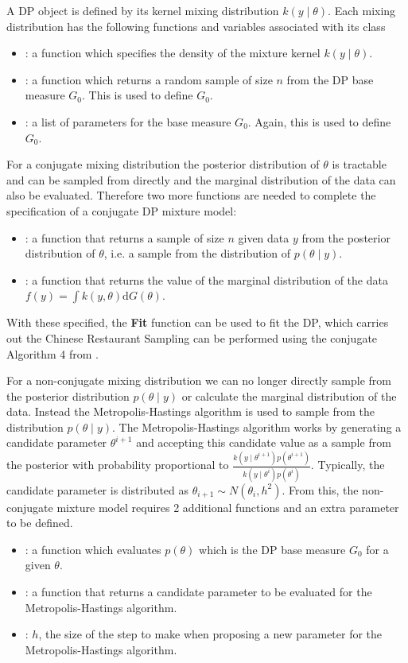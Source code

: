 \documentclass[nojss]{jss}
\begin{document}
A DP object is defined by its kernel mixing distribution $k(y \mid \theta)$. Each mixing distribution has the following functions and variables associated with its class
\begin{itemize}
\item {}: a function which specifies the density of the mixture kernel $k(y \mid \theta)$.
\item {}: a function which returns a random sample of size $n$ from the DP base measure $G_0$. This is used to define $G_0$.
\item {}: a list of parameters for the base measure $G_0$. Again, this is used to define $G_0$.
\end{itemize}

For a conjugate mixing distribution the posterior distribution of $\theta$ is tractable and can be sampled from directly and the marginal distribution of the data can also be evaluated. Therefore two more functions are needed to complete the specification of a conjugate DP mixture model:
\begin{itemize}
\item {}: a function that returns a sample of size $n$ given data $y$ from the posterior distribution of $\theta$, i.e. a sample from the distribution of $p(\theta \mid y)$.
\item {}: a function that returns the value of the marginal distribution of the data $f(y) = \int k(y , \theta) \mathrm{d} G(\theta)$.
\end{itemize}

With these specified, the \textbf{Fit} function can be used to fit the DP, which carries out the Chinese Restaurant Sampling can be performed using the conjugate Algorithm 4 from \citep{neal_markov_2000}.

For a non-conjugate mixing distribution we can no longer directly sample from the posterior distribution $p(\theta \mid y)$ or calculate the marginal distribution of the data. Instead the Metropolis-Hastings algorithm is used to sample from the distribution $p(\theta \mid y)$. The Metropolis-Hastings algorithm works by generating a candidate parameter $\theta ^{i+1}$ and accepting this candidate value as a sample from the posterior with probability proportional to $\frac{k(y \mid \theta ^{i+1}) p(\theta ^{i+1})}{k(y \mid \theta^i) p(\theta^i)}$. Typically, the candidate parameter is distributed as $\theta _{i+1} \sim N(\theta _i, h^2)$. From this, the non-conjugate mixture model requires 2 additional functions and an extra parameter to be defined.
\begin{itemize}
\item {}: a function which evaluates $p(\theta)$ which is the DP base measure $G_0$ for a given $\theta$.
\item {}: a function that returns a candidate parameter to be evaluated for the Metropolis-Hastings algorithm.
\item {}: $h$, the size of the step to make when proposing a new parameter for the Metropolis-Hastings algorithm.
\end{itemize}
\end{document}
